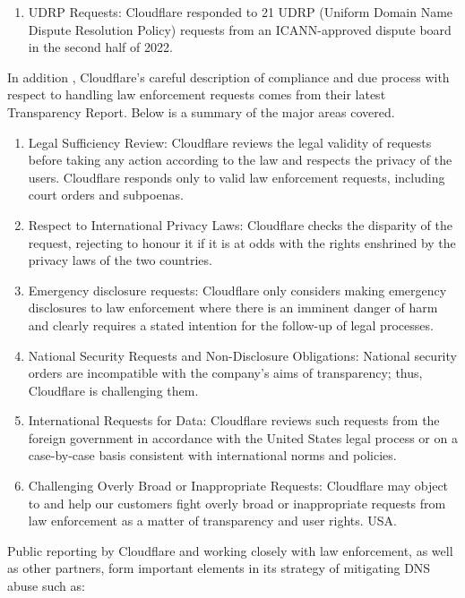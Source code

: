 \begin{enumerate}
\begin{enumerate}
    \item UDRP Requests: Cloudflare responded to 21 UDRP (Uniform Domain Name Dispute Resolution Policy) requests from an ICANN-approved dispute board in the second half of 2022.
    
\end{enumerate}

In addition , Cloudflare's careful description of compliance and due process with respect to handling law enforcement requests comes from their latest Transparency Report. Below is a summary of the major areas covered.

\begin{enumerate}
    \item Legal Sufficiency Review: Cloudflare reviews the legal validity of requests before taking any action according to the law and respects the privacy of the users. Cloudflare responds only to valid law enforcement requests, including court orders and subpoenas.

 \item Respect to International Privacy Laws: Cloudflare checks the disparity of the request, rejecting to honour it if it is at odds with the rights enshrined by the privacy laws of the two countries.


 \item Emergency disclosure requests: Cloudflare only considers making emergency disclosures to law enforcement where there is an imminent danger of harm and clearly requires a stated intention for the follow-up of legal processes.

 \item  National Security Requests and Non-Disclosure Obligations: National security orders are incompatible with the company's aims of transparency; thus, Cloudflare is challenging them.

 \item  International Requests for Data: Cloudflare reviews such requests from the foreign government in accordance with the United States legal process or on a case-by-case basis consistent with international norms and policies.

 \item  Challenging Overly Broad or Inappropriate Requests: Cloudflare may object to and help our customers fight overly broad or inappropriate requests from law enforcement as a matter of transparency and user rights. USA.
\end{enumerate}

Public reporting by Cloudflare and working closely with law enforcement, as well as other partners, form important elements in its strategy of mitigating DNS abuse such as: 


\end{enumerate}
